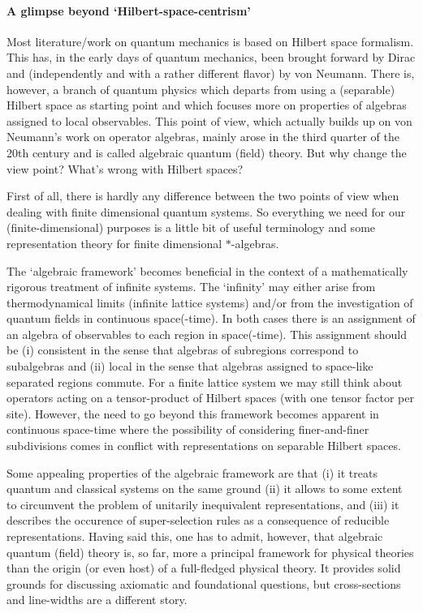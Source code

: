 \documentclass[11pt,a4paper]{article}
\theoremstyle{plain}
\theoremstyle{definition}
\theoremstyle{remark}
\numberwithin{equation}{section}
\begin{document}
\paragraph{A glimpse beyond `Hilbert-space-centrism'}
Most literature/work on quantum mechanics is based on Hilbert space formalism. This has, in the early days of quantum mechanics, been brought forward by Dirac and (independently and with a rather different flavor) by von Neumann. There is, however, a branch of quantum physics which departs from using a (separable) Hilbert space as starting point and which focuses more on properties of algebras assigned to local observables. This point of view, which actually builds up on von Neumann's work on operator algebras, mainly arose in the third quarter of the 20th century and is called algebraic quantum (field) theory. But why change the view point? What's wrong with Hilbert spaces?

First of all, there is hardly any difference between the two points of view when dealing with finite dimensional quantum systems. So everything we need for our (finite-dimensional) purposes is a little bit of useful terminology and some representation theory for finite dimensional $\ast$-algebras.

The `algebraic framework' becomes beneficial in the context of a mathematically rigorous treatment of infinite systems. The `infinity' may either arise from thermodynamical limits (infinite lattice systems) and/or from the investigation of quantum fields in continuous space(-time). In both cases there is an assignment of an algebra of observables to each region in space(-time). This assignment should be (i) consistent in the sense that algebras of subregions correspond to subalgebras and (ii) local in the sense that algebras assigned to space-like separated regions commute. For a finite lattice system we may still think about operators acting on a tensor-product of Hilbert spaces (with one tensor factor per site). However, the need to go beyond this framework becomes apparent in continuous space-time where the possibility of considering finer-and-finer subdivisions comes in conflict with representations on separable Hilbert spaces.

Some appealing properties of the algebraic framework are that (i) it treats quantum and classical systems on the same ground (ii) it allows to some extent to circumvent the problem of unitarily inequivalent representations, and (iii) it describes the occurence of super-selection rules as a consequence of reducible representations. Having said this, one has to admit, however, that algebraic quantum (field) theory is, so far, more a principal framework for physical theories than the origin (or even host) of a full-fledged physical theory. It provides solid grounds for discussing axiomatic and foundational questions, but cross-sections and line-widths are a different story.
\end{document}
